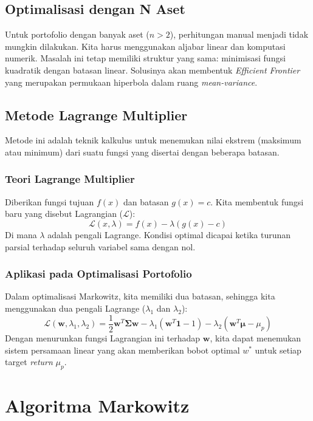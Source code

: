 \documentclass[12pt,a4paper]{book}
\begin{document}
\section{Optimalisasi dengan N Aset}
Untuk portofolio dengan banyak aset ($n > 2$), perhitungan manual menjadi tidak mungkin dilakukan. Kita harus menggunakan aljabar linear dan komputasi numerik. Masalah ini tetap memiliki struktur yang sama: minimisasi fungsi kuadratik dengan batasan linear. Solusinya akan membentuk \textit{Efficient Frontier} yang merupakan permukaan hiperbola dalam ruang \textit{mean-variance}.

\section{Metode Lagrange Multiplier}
Metode ini adalah teknik kalkulus untuk menemukan nilai ekstrem (maksimum atau minimum) dari suatu fungsi yang disertai dengan beberapa batasan.

\subsection{Teori Lagrange Multiplier}
Diberikan fungsi tujuan $f(x)$ dan batasan $g(x) = c$. Kita membentuk fungsi baru yang disebut Lagrangian ($\mathcal{L}$):
\begin{equation}
    \mathcal{L}(x, \lambda) = f(x) - \lambda(g(x) - c)
\end{equation}
Di mana $\lambda$ adalah pengali Lagrange. Kondisi optimal dicapai ketika turunan parsial terhadap seluruh variabel sama dengan nol.

\subsection{Aplikasi pada Optimalisasi Portofolio}
Dalam optimalisasi Markowitz, kita memiliki dua batasan, sehingga kita menggunakan dua pengali Lagrange ($\lambda_1$ dan $\lambda_2$):
\begin{equation}
    \mathcal{L}(\mathbf{w}, \lambda_1, \lambda_2) = \frac{1}{2} \mathbf{w}^T \mathbf{\Sigma} \mathbf{w} - \lambda_1 (\mathbf{w}^T \mathbf{1} - 1) - \lambda_2 (\mathbf{w}^T \mathbf{\mu} - \mu_p)
\end{equation}
Dengan menurunkan fungsi Lagrangian ini terhadap $\mathbf{w}$, kita dapat menemukan sistem persamaan linear yang akan memberikan bobot optimal $w^*$ untuk setiap target \textit{return} $\mu_p$.

\chapter{Algoritma Markowitz}
\end{document}
